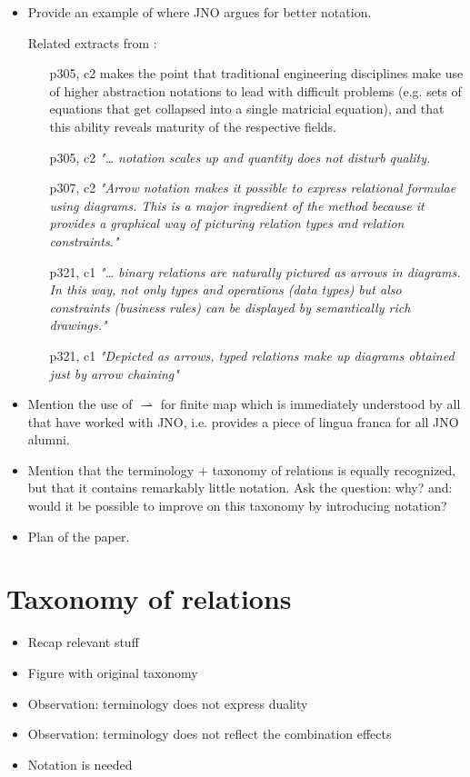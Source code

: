 \documentclass[runningheads,a4paper]{llncs}
\begin{document}
\begin{itemize}
\item Provide an example of where JNO argues for better notation.

Related extracts from \cite{DBLP:journals/tse/OliveiraF13}:
\begin{itemize}
  \item[p305, c2] makes the point that traditional engineering disciplines make use of higher abstraction notations to lead with difficult problems (e.g. sets of equations that get collapsed into a single matricial equation), and that this ability reveals maturity of the respective fields.
  \item[p305, c2] \it{"… notation scales up and quantity does not disturb quality.}
  \item[p307, c2] \it{"Arrow notation makes it possible to express relational formulae using diagrams. This is a major ingredient of the method because it provides a graphical way of picturing relation types and relation constraints."}
  \item[p321, c1] \it{"… binary relations are naturally pictured as arrows in diagrams. In this way, not only types and operations (data types) but also constraints (business rules) can be displayed by semantically rich drawings."}
  \item[p321, c1] \it{"Depicted as arrows, typed relations make up diagrams obtained just by arrow chaining"}
\end{itemize}

\item Mention the use of $\rightharpoonup$ for finite map which is immediately understood by all that have worked with JNO, i.e. provides a piece of lingua franca for all JNO alumni.
\item Mention that the terminology + taxonomy of relations is equally recognized, but that it contains remarkably little notation. Ask the question: why? and: would it be possible to improve on this taxonomy by introducing notation?
\item Plan of the paper.
\end{itemize}

\section{Taxonomy of relations}

\begin{itemize}
\item Recap relevant stuff
\item Figure with original taxonomy
\item Observation: terminology does not express duality
\item Observation: terminology does not reflect the combination effects
\item Notation is needed
\end{itemize}
\end{document}
